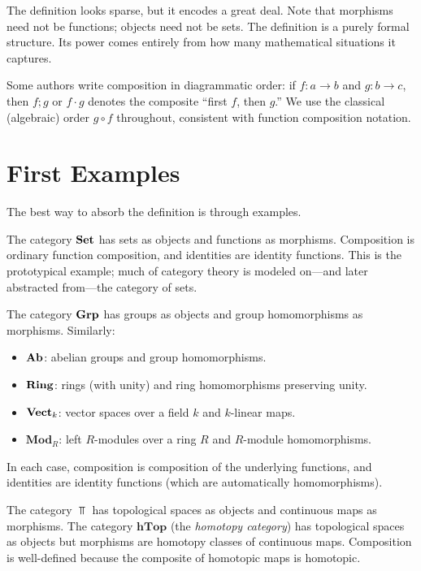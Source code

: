 The definition looks sparse, but it encodes a great deal. Note that morphisms need not be functions; objects need not be sets. The definition is a purely formal structure. Its power comes entirely from how many mathematical situations it captures.

\begin{remark}
Some authors write composition in diagrammatic order: if $f: a \to b$ and $g: b \to c$, then $f;g$ or $f \cdot g$ denotes the composite ``first $f$, then $g$.'' We use the classical (algebraic) order $g \circ f$ throughout, consistent with function composition notation.
\end{remark}

\section{First Examples}
\label{sec:cat-examples}

The best way to absorb the definition is through examples.

\begin{example}[$\Set$]
The category $\Set$ has sets as objects and functions as morphisms. Composition is ordinary function composition, and identities are identity functions. This is the prototypical example; much of category theory is modeled on—and later abstracted from—the category of sets.
\end{example}

\begin{example}[$\Grp$, $\Ab$, $\Ring$]
The category $\Grp$ has groups as objects and group homomorphisms as morphisms. Similarly:
\begin{itemize}
  \item $\Ab$: abelian groups and group homomorphisms.
  \item $\Ring$: rings (with unity) and ring homomorphisms preserving unity.
  \item $\mathbf{Vect}_k$: vector spaces over a field $k$ and $k$-linear maps.
  \item $\mathbf{Mod}_R$: left $R$-modules over a ring $R$ and $R$-module homomorphisms.
\end{itemize}
In each case, composition is composition of the underlying functions, and identities are identity functions (which are automatically homomorphisms).
\end{example}

\begin{example}[$\Top$]
The category $\Top$ has topological spaces as objects and continuous maps as morphisms. The category $\mathbf{hTop}$ (the \emph{homotopy category}) has topological spaces as objects but morphisms are homotopy classes of continuous maps. Composition is well-defined because the composite of homotopic maps is homotopic.
\end{example}

